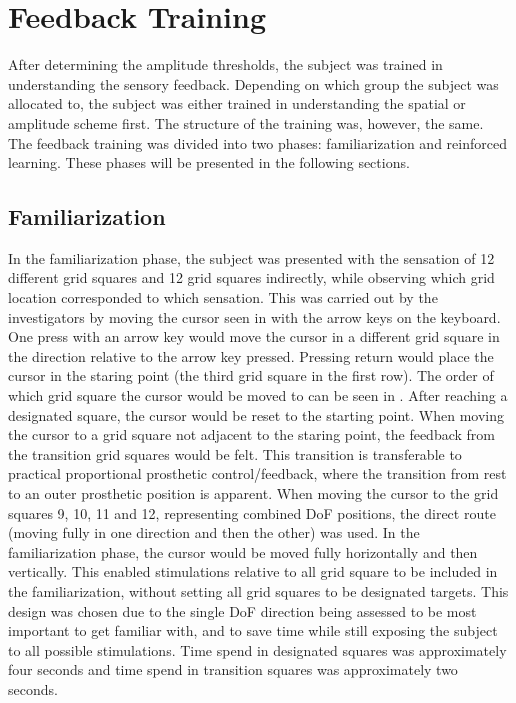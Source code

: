
\section{Feedback Training}
After determining the amplitude thresholds, the subject was trained in understanding the sensory feedback. Depending on which group the subject was allocated to, the subject was either trained in understanding the spatial or amplitude scheme first. The structure of the training was, however, the same. The feedback training was divided into two phases: familiarization and reinforced learning. These phases will be presented in the following sections.

\subsection{Familiarization} \label{sec:meth:FBtrainingFam}
In the familiarization phase, the subject was presented with the sensation of 12 different grid squares and 12 grid squares indirectly, while observing which grid location corresponded to which sensation. This was carried out by the investigators by moving the cursor seen in  with the arrow keys on the keyboard. One press with an arrow key would move the cursor in a different grid square in the direction relative to the arrow key pressed. Pressing return would place the cursor in the staring point (the third grid square in the first row). The order of which grid square the cursor would be moved to can be seen in . After reaching a designated square, the cursor would be reset to the starting point. When moving the cursor to a grid square not adjacent to the staring point, the feedback from the transition grid squares would be felt. This transition is transferable to practical proportional prosthetic control/feedback, where the transition from rest to an outer prosthetic position is apparent. When moving the cursor to the grid squares 9, 10, 11 and 12, representing combined DoF positions, the direct route (moving fully in one direction and then the other) was used. In the familiarization phase, the cursor would be moved fully horizontally and then vertically. This enabled stimulations relative to all grid square to be included in the familiarization, without setting all grid squares to be designated targets. This design was chosen due to the single DoF direction being assessed to be most important to get familiar with, and to save time while still exposing the subject to all possible stimulations. Time spend in designated squares was approximately four seconds and time spend in transition squares was approximately two seconds.

